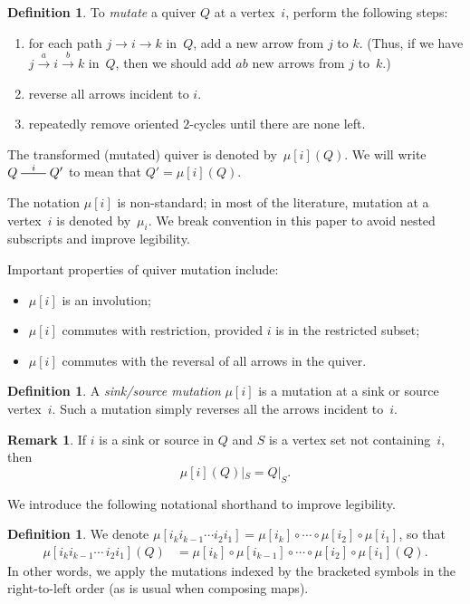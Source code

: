 \documentclass[11pt, letterpaper]{amsart}
\theoremstyle{definition}
\newtheorem{remark}[theorem]{Remark}
\newtheorem{definition}[theorem]{Definition}
\numberwithin{equation}{section}
\newcommand{\T}[2]{\mu[#1](#2)} %
\newcommand{\mutation}[1]{\stackrel{#1}{\rule[.5ex]{2em}{0.5pt}}}
\begin{document}
\begin{definition}
\label{def:quiver-mutation}
To \emph{mutate} a quiver $Q$ at a vertex~$i$, perform the following steps:
\begin{enumerate}[leftmargin=.3in]
    \item for each path $j \rightarrow i \rightarrow k$ in~$Q$, add a new arrow from $j$ to $k$. 
    (Thus, if we have $j \stackrel{\scriptstyle a}{\longrightarrow} i \stackrel{\scriptstyle b}{\longrightarrow} k$ in~$Q$,
    then we should add $ab$ new arrows from $j$ to~$k$.)
    \item reverse all arrows incident to $i$.
    \item repeatedly remove oriented $2$-cycles until there are none left.
\end{enumerate}
The transformed (mutated) quiver is denoted by~$\T{i}{Q}$. We will write $Q \mutation{i} Q'$ to mean that $Q' = \T{i}{Q}$.
\end{definition}

The notation $\mu[i]$ is non-standard; in most of the literature, mutation at a vertex~$i$ is denoted by~$\mu_i$.  
We break convention in this paper to avoid nested subscripts and improve legibility.

\pagebreak[3]

Important properties of quiver mutation include:
\begin{itemize}[leftmargin=.2in]
\item 
$\mu[i]$ is an involution;
\item
$\mu[i]$ commutes with restriction, provided $i$ is in the restricted subset;
\item
$\mu[i]$ commutes with the reversal of all arrows in the quiver.
\end{itemize}

\begin{definition}
A \emph{sink/source mutation} $\mu[i]$ is a mutation at a sink or source vertex~$i$. 
Such a mutation simply reverses all the arrows incident to~$i$.
\end{definition}


\begin{remark}
If $i$ is a sink or source in $Q$ and $S$ is a vertex set not containing~$i$, then
\[
\T{i}{Q}|_S = Q|_S.
\]
\end{remark}

We introduce the following notational shorthand to improve legibility. 

\begin{definition}
\label{def:stringOfMutations}
We denote $\mu[i_k i_{k-1}\cdots i_2 i_1] = \mu[i_k] \circ \cdots \circ \mu[i_2] \circ \mu[i_1]$, 
so that 
\begin{align*}
\mu[i_k i_{k-1}\cdots\, i_2 i_1](Q) &= \mu[i_k] \circ \mu[i_{k-1}] \circ \cdots \circ \mu[i_2] \circ \mu[i_1](Q).
\end{align*}
In other words, we apply the mutations indexed by the bracketed symbols 
in the right-to-left order (as is usual when composing maps).
\end{definition}
\end{document}
